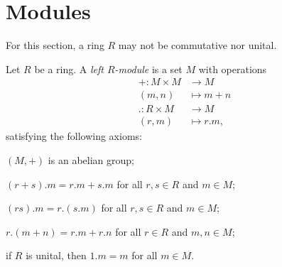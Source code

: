 \documentclass[10pt]{mypackage}
\begin{document}
\section{Modules}%
For this section, a ring $R$ may not be commutative nor unital.
\begin{definition}
  Let $R$ be a ring. A \textit{left $R$-module} is a set $M$ with operations
  \begin{align*}
    +\colon M\times M&\rightarrow M\\
    \left( m,n \right) &\mapsto m+n\\
    .\colon R\times M&\rightarrow M\\
    \left( r,m \right) &\mapsto r.m,
  \end{align*}
  satisfying the following axioms:
  \begin{description}[font=\normalfont]
    \item[(M0)] $\left( M,+ \right)$ is an abelian group;
    \item[(M1)] $\left( r+s \right).m = r.m + s.m$ for all $r,s\in R$ and $m\in M$;
    \item[(M2)] $\left( rs \right).m = r.\left( s.m \right)$ for all $r,s\in R$ and $m\in M$;
    \item[(M3)] $r.\left( m+n \right) = r.m + r.n$ for all $r\in R$ and $m,n\in M$;
    \item[(M4)] if $R$ is unital, then $1.m = m$ for all $m\in M$.
  \end{description}
\end{definition}
\end{document}
